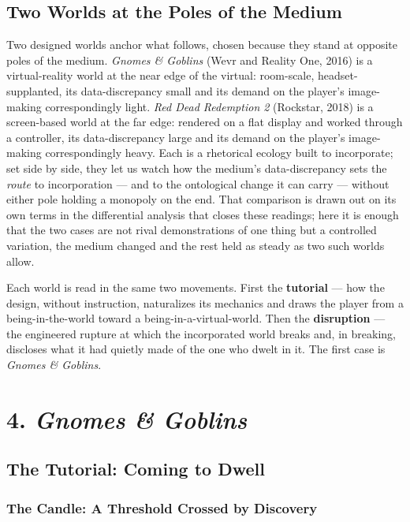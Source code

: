 \documentclass{article}
\begin{document}
\bigskip

\subsection*{Two Worlds at the Poles of the Medium}

Two designed worlds anchor what follows, chosen because they stand at opposite poles of the medium. \textit{Gnomes \& Goblins} (Wevr and Reality One, 2016) is a virtual-reality world at the near edge of the virtual: room-scale, headset-supplanted, its data-discrepancy small and its demand on the player's image-making correspondingly light. \textit{Red Dead Redemption 2} (Rockstar, 2018) is a screen-based world at the far edge: rendered on a flat display and worked through a controller, its data-discrepancy large and its demand on the player's image-making correspondingly heavy. Each is a rhetorical ecology built to incorporate; set side by side, they let us watch how the medium's data-discrepancy sets the \textit{route} to incorporation — and to the ontological change it can carry — without either pole holding a monopoly on the end. That comparison is drawn out on its own terms in the differential analysis that closes these readings; here it is enough that the two cases are not rival demonstrations of one thing but a controlled variation, the medium changed and the rest held as steady as two such worlds allow.

Each world is read in the same two movements. First the \textbf{tutorial} — how the design, without instruction, naturalizes its mechanics and draws the player from a being-in-the-world toward a being-in-a-virtual-world. Then the \textbf{disruption} — the engineered rupture at which the incorporated world breaks and, in breaking, discloses what it had quietly made of the one who dwelt in it. The first case is \textit{Gnomes \& Goblins}.

\bigskip

\section*{4. \textit{Gnomes \& Goblins}}

\subsection*{The Tutorial: Coming to Dwell}

\subsubsection*{The Candle: A Threshold Crossed by Discovery}
\end{document}
